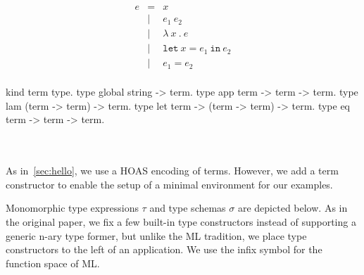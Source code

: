 \documentclass[a4paper, 11pt]{book}
\begin{document}
\begin{center}
\begin{minipage}{0.35\textwidth}
$$
\begin{array}{lrl}
  e & =     & x                                 \\
  & \vert & e_1\ e_2                            \\
  & \vert & \lambda\ x\ .\ e                    \\
  & \vert & \mathtt{let}\ x = e_1\ \mathtt{in}\ e_2 \\
  & \vert & e_1 = e_2 \\
\end{array}
$$
\end{minipage}
\begin{minipage}{0.60\textwidth}
\vspace{0.5em}
\begin{elpicodelj}
kind term   type.
type global string -> term.
type app    term -> term -> term.
type lam    (term -> term) -> term.
type let    term -> (term -> term) -> term.
type eq     term -> term -> term.
\end{elpicodelj}
\end{minipage}
\end{center}
~\\  
~\\  

As in~\cref{sec:hello}, we use a HOAS encoding of terms. However, we add a
 term constructor to enable the setup of a minimal environment
for our examples.

Monomorphic type expressions $\tau$ and type schemas $\sigma$ are depicted
below. As in the original paper, we fix a few built-in type constructors
instead of supporting a generic n-ary type former, but unlike the ML
tradition, we place type constructors to the left of an application. We use
the infix symbol \elpi{-->} for the function space of ML.
\end{document}
